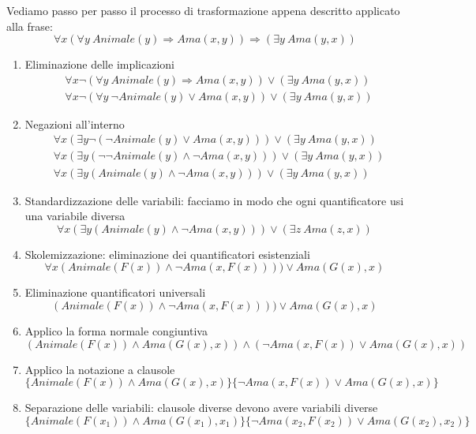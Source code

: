 \begin{example}
	Vediamo passo per passo il processo di trasformazione appena descritto applicato alla frase:
	\begin{equation*}
		\forall x(\forall y \: Animale(y) \Rightarrow Ama(x,y)) \Rightarrow (\exists y \: Ama(y,x))
	\end{equation*}
	\begin{enumerate}
		\item Eliminazione delle implicazioni
		\begin{align*}
			&\forall x \neg(\forall y \: Animale(y) \Rightarrow Ama(x,y)) \lor (\exists y \: Ama(y,x))\\
			&\forall x\neg(\forall y \: \neg Animale(y) \lor Ama(x,y)) \lor (\exists y \: Ama(y,x))
		\end{align*}
		\item Negazioni all'interno
		\begin{align*}
			&\forall x(\exists y \neg (\neg Animale(y) \lor Ama(x,y))) \lor (\exists y \: Ama(y,x)) \\
			&\forall x(\exists y (\neg\neg Animale(y) \land \neg Ama(x,y))) \lor (\exists y \: Ama(y,x))\\
			&\forall x(\exists y (Animale(y) \land \neg Ama(x,y))) \lor (\exists y \: Ama(y,x))
		\end{align*}
		\item Standardizzazione delle variabili: facciamo in modo che ogni quantificatore usi una variabile diversa
		\begin{equation*}
			\forall x(\exists y (Animale(y) \land \neg Ama(x,y))) \lor (\exists z \: Ama(z,x))
		\end{equation*}
		\item Skolemizzazione: eliminazione dei quantificatori esistenziali
		\begin{equation*}
			\forall x(Animale(F(x)) \land \neg Ama(x,F(x)))) \lor Ama(G(x),x)
		\end{equation*}
		\item Eliminazione quantificatori universali
		\begin{equation*}
			(Animale(F(x)) \land \neg Ama(x,F(x)))) \lor Ama(G(x),x)
		\end{equation*}
		\item Applico la forma normale congiuntiva
		\begin{equation*}
			(Animale(F(x)) \land Ama(G(x),x)) \land (\neg Ama(x, F(x)) \lor Ama(G(x), x))
		\end{equation*}
		\item Applico la notazione a clausole
		\begin{equation*}
			\{Animale(F(x)) \land Ama(G(x),x)\} \{\neg Ama(x, F(x)) \lor Ama(G(x), x)\}
		\end{equation*}
		\item Separazione delle variabili: clausole diverse devono avere variabili diverse
		\begin{equation*}
			\{Animale(F(x_1)) \land Ama(G(x_1),x_1)\} \{\neg Ama(x_2, F(x_2)) \lor Ama(G(x_2), x_2)\}
		\end{equation*}
	\end{enumerate}
\end{example}

